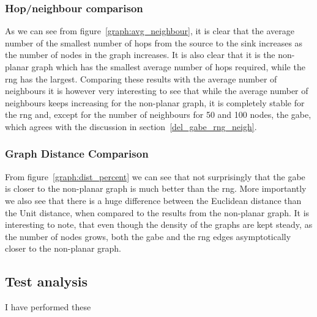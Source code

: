 \subsubsection{Hop/neighbour comparison}
\label{section:hop_neighbour_comparison}

As we can see from figure~\ref{graph:avg_neighbour}, it is clear that the average number of the smallest number of hops from the source to the sink increases as the number of nodes in the graph increases. It is also clear that it is the non-planar graph which has the smallest average number of hops required, while the \ac{rng} has the largest. Comparing these results with the average number of neighbours it is however very interesting to see that while the average number of neighbours keeps increasing for the non-planar graph, it is completely stable for the \ac{rng} and, except for the number of neighbours for 50 and 100 nodes, the \ac{gabe}, which agrees with the discussion in section~\ref{del_gabe_rng_neigh}. 

\subsubsection{Graph Distance Comparison}
\label{section:graph_distance_comparison}


From figure~\ref{graph:dist_percent} we can see that not surprisingly that the \ac{gabe} is closer to the non-planar graph is much better than the \ac{rng}. More importantly we also see that there is a huge difference between the Euclidean distance than the Unit distance, when compared to the results from the non-planar graph. It is interesting to note, that even though the density of the graphs are kept steady, as the number of nodes grows, both the \ac{gabe} and the \ac{rng} edges asymptotically closer to the non-planar graph. 

\subsection{}







\subsection{Test analysis}


I have performed these


\subsection{}
\label{section:test_results_spanners}
